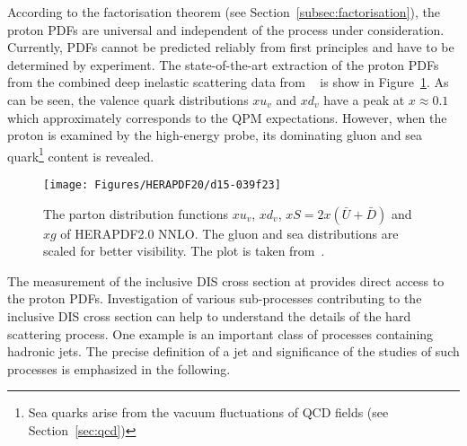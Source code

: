 According to the factorisation theorem (see Section~\ref{subsec:factorisation}), the proton PDFs are universal and independent of the process under consideration. Currently, PDFs cannot be predicted reliably from first principles and have to be determined by experiment. The state-of-the-art extraction of the proton PDFs from the combined deep inelastic scattering data from \hera~\cite{Abramowicz:2015mha} is show in Figure~\ref{fig:d15-039f23}. As can be seen, the valence quark distributions $xu_v$ and $xd_v$ have a peak at $x\approx 0.1$ which approximately corresponds to the QPM expectations. However, when the proton is examined by the high-energy probe, its dominating gluon and sea quark\footnote{Sea quarks arise from the vacuum fluctuations of QCD fields (see Section~\ref{sec:qcd})} content is revealed.
\begin{figure}[t!]
	\centering
		\texttt{[image: Figures/HERAPDF20/d15-039f23]}
	\caption{The parton distribution functions $xu_v$, $xd_v$, $xS=2x\left(\bar{U}+\bar{D}\right)$ and $xg$ of HERAPDF2.0 NNLO. The gluon and sea distributions are scaled for better visibility. The plot is taken from~\protect\cite{Abramowicz:2015mha}.}
	\label{fig:d15-039f23}
\end{figure}

The measurement of the inclusive DIS cross section at \hera provides direct access to the proton PDFs. Investigation of various sub-processes contributing to the inclusive DIS cross section can help to understand the details of the hard scattering process. One example is an important class of processes containing hadronic jets. The precise definition of a jet and significance of the studies of such processes is emphasized in the following.
